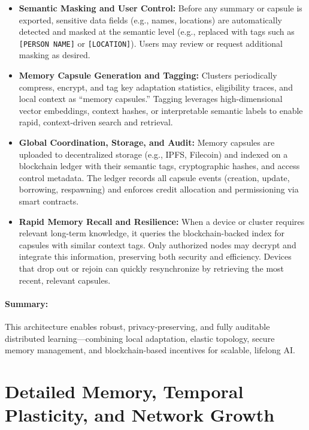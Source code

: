 \documentclass[11pt]{article}
\begin{document}
\begin{itemize}
    \item \textbf{Semantic Masking and User Control:} Before any summary or capsule is exported, sensitive data fields (e.g., names, locations) are automatically detected and masked at the semantic level (e.g., replaced with tags such as \texttt{[PERSON NAME]} or \texttt{[LOCATION]}). Users may review or request additional masking as desired.

    \item \textbf{Memory Capsule Generation and Tagging:} Clusters periodically compress, encrypt, and tag key adaptation statistics, eligibility traces, and local context as “memory capsules.” Tagging leverages high-dimensional vector embeddings, context hashes, or interpretable semantic labels to enable rapid, context-driven search and retrieval.

    \item \textbf{Global Coordination, Storage, and Audit:} Memory capsules are uploaded to decentralized storage (e.g., IPFS, Filecoin) and indexed on a blockchain ledger with their semantic tags, cryptographic hashes, and access control metadata. The ledger records all capsule events (creation, update, borrowing, respawning) and enforces credit allocation and permissioning via smart contracts.

    \item \textbf{Rapid Memory Recall and Resilience:} When a device or cluster requires relevant long-term knowledge, it queries the blockchain-backed index for capsules with similar context tags. Only authorized nodes may decrypt and integrate this information, preserving both security and efficiency. Devices that drop out or rejoin can quickly resynchronize by retrieving the most recent, relevant capsules.
\end{itemize}

\paragraph{Summary:}
This architecture enables robust, privacy-preserving, and fully auditable distributed learning—combining local adaptation, elastic topology, secure memory management, and blockchain-based incentives for scalable, lifelong AI.


\section{Detailed Memory, Temporal Plasticity, and Network Growth}
\end{document}
